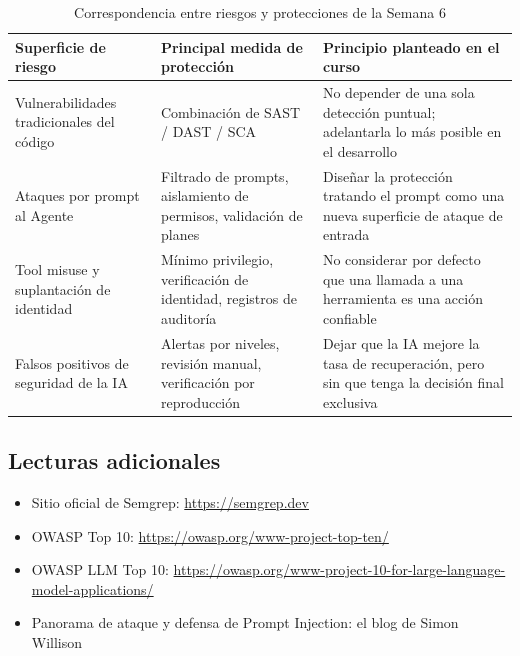 \begin{table}[H]
\centering
\begin{tabular}{p{} p{} p{}}
\toprule
Superficie de riesgo & Principal medida de protección & Principio planteado en el curso \\
\midrule
Vulnerabilidades tradicionales del código & Combinación de SAST / DAST / SCA & No depender de una sola detección puntual; adelantarla lo más posible en el desarrollo \\
Ataques por prompt al Agente & Filtrado de prompts, aislamiento de permisos, validación de planes & Diseñar la protección tratando el prompt como una nueva superficie de ataque de entrada \\
Tool misuse y suplantación de identidad & Mínimo privilegio, verificación de identidad, registros de auditoría & No considerar por defecto que una llamada a una herramienta es una acción confiable \\
Falsos positivos de seguridad de la IA & Alertas por niveles, revisión manual, verificación por reproducción & Dejar que la IA mejore la tasa de recuperación, pero sin que tenga la decisión final exclusiva \\
\bottomrule
\end{tabular}
\caption{Correspondencia entre riesgos y protecciones de la Semana 6}
\end{table}

\subsection{Lecturas adicionales}

\begin{itemize}
    \item Sitio oficial de Semgrep: \url{https://semgrep.dev}
    \item OWASP Top 10: \url{https://owasp.org/www-project-top-ten/}
    \item OWASP LLM Top 10: \url{https://owasp.org/www-project-10-for-large-language-model-applications/}
    \item Panorama de ataque y defensa de Prompt Injection: el blog de Simon Willison
\end{itemize}



